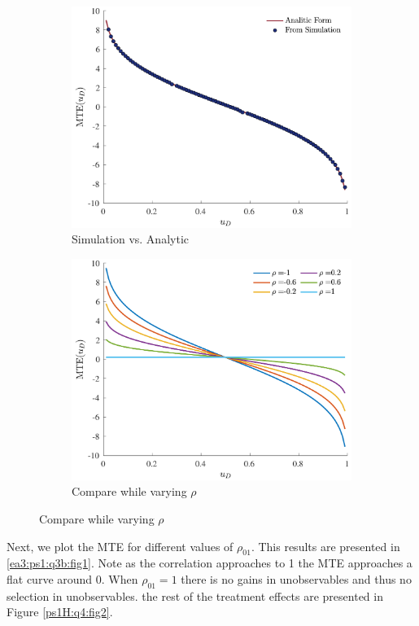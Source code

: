 \documentclass{article}
\begin{document}
\begin{solution}
\begin{figure}[htb]
\begin{subfigure}[b]{0.43\textwidth}
         \includegraphics[width=\textwidth]{ps1Heckman/Figures/MTEcompare.pdf}
         \caption{Simulation vs. Analytic}
         \label{ps1H:q4:fig1a}
     \end{subfigure}
     \begin{subfigure}[b]{0.43\textwidth}
         \centering
         \includegraphics[width=\textwidth]{ps1Heckman/Figures/MTEgrid.pdf}
         \caption{Compare while varying $\rho$}
         \label{ps1H:q4:fig1b}
     \end{subfigure}
\end{figure}
\FloatBarrier
Next, we plot the MTE for different values of $\rho_{01}$. This results are presented in \ref{ea3:ps1:q3b:fig1}. Note as the correlation approaches to 1 the MTE approaches a flat curve around 0. When $\rho_{01}=1$ there is no gains in unobservables and thus no selection in unobservables. the rest of the treatment effects are presented in Figure \ref{ps1H:q4:fig2}. 
\end{solution}
\end{document}
